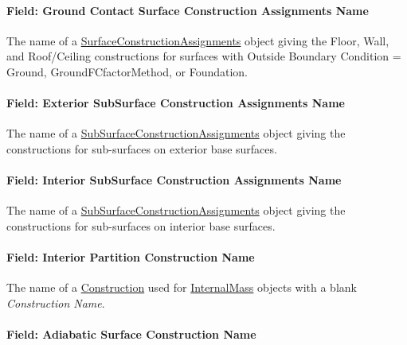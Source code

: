\paragraph{Field: Ground Contact Surface Construction Assignments Name}\label{constructionassignmentset-field-ground-contact-surface-construction-assignments-name}

The name of a \hyperref[surfaceconstructionassignments]{SurfaceConstructionAssignments} object giving the Floor, Wall, and Roof/Ceiling constructions for surfaces with Outside Boundary Condition = Ground, GroundFCfactorMethod, or Foundation.

\paragraph{Field: Exterior SubSurface Construction Assignments Name}\label{constructionassignmentset-field-exterior-subsurface-construction-assignments-name}

The name of a \hyperref[subsurfaceconstructionassignments]{SubSurfaceConstructionAssignments} object giving the constructions for sub-surfaces on exterior base surfaces.

\paragraph{Field: Interior SubSurface Construction Assignments Name}\label{constructionassignmentset-field-interior-subsurface-construction-assignments-name}

The name of a \hyperref[subsurfaceconstructionassignments]{SubSurfaceConstructionAssignments} object giving the constructions for sub-surfaces on interior base surfaces.

\paragraph{Field: Interior Partition Construction Name}\label{constructionassignmentset-field-interior-partition-construction-name}

The name of a \hyperref[construction-000]{Construction} used for \hyperref[internalmass]{InternalMass} objects with a blank \emph{Construction Name}.

\paragraph{Field: Adiabatic Surface Construction Name}\label{constructionassignmentset-field-adiabatic-surface-construction-name}

